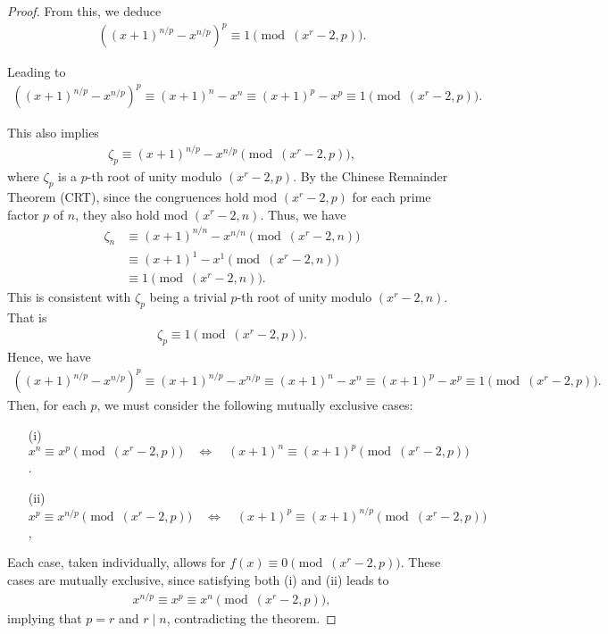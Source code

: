 \documentclass{article}
\theoremstyle{plain}
\theoremstyle{definition}
\begin{document}
\begin{proof}
From this, we deduce
\begin{align*}
\left( (x+1)^{n/p} - x^{n/p} \right)^p \equiv 1 \pmod{(x^r-2, p)} .
\end{align*}

Leading to
\begin{align*}
\left( (x+1)^{n/p} - x^{n/p} \right)^p \equiv (x+1)^n - x^n \equiv (x+1)^p - x^p \equiv 1 \pmod{(x^r-2, p)} .
\end{align*}

This also implies
\begin{align*}
    \zeta_p \equiv (x+1)^{n/p} - x^{n/p} \pmod{(x^r-2, p)} ,
\end{align*}
where $\zeta_p$ is a $p$-th root of unity modulo $(x^r-2, p)$. By the Chinese Remainder Theorem (CRT), since the congruences hold mod $(x^r-2, p)$ for each prime factor $p$ of $n$, they also hold mod $(x^r-2, n)$. Thus, we have
\begin{align*}
\zeta_n &\equiv (x+1)^{n/n} - x^{n/n} \pmod{(x^r-2, n)} \\
&\equiv (x+1)^1 - x^1 \pmod{(x^r-2, n)} \\
&\equiv 1 \pmod{(x^r-2, n)} .
\end{align*}
This is consistent with $\zeta_p$ being a trivial $p$-th root of unity modulo $(x^r-2, n)$. That is
\begin{align*}
\zeta_p \equiv 1 \pmod{(x^r-2, p)} .
\end{align*}
Hence, we have
\begin{align*}
\left( (x+1)^{n/p} - x^{n/p} \right)^p \equiv (x+1)^{n/p} - x^{n/p} \equiv (x+1)^n - x^n \equiv (x+1)^p - x^p \equiv 1 \pmod{(x^r-2, p)} .
\end{align*}
Then, for each $p$, we must consider the following mutually exclusive cases:
\begin{enumerate}
\item[(i)] $x^n \equiv x^p \pmod{(x^r-2, p)} \quad\Longleftrightarrow\quad (x+1)^n \equiv (x+1)^p \pmod{(x^r-2, p)}$.
\item[(ii)] $x^p \equiv x^{n/p} \pmod{(x^r-2, p)} \quad\Longleftrightarrow\quad (x+1)^p \equiv (x+1)^{n/p} \pmod{(x^r-2, p)}$,
\end{enumerate}
Each case, taken individually, allows for $f(x) \equiv 0 \pmod{(x^r-2,p)}$. These cases are mutually exclusive, since satisfying both (i) and (ii) leads to
\begin{align*}
    x^{n/p} \equiv x^p \equiv x^n \pmod{(x^r-2, p)} ,
\end{align*}
implying that $p=r$ and $r \mid n$, contradicting the theorem.


\end{proof}
\end{document}
